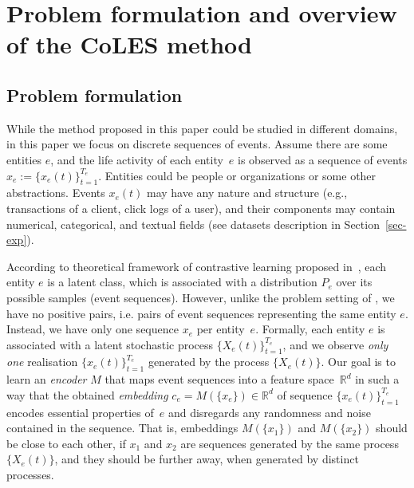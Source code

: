 \documentclass[sigconf]{acmart}
\newcommand{\R}{\mathbb{R}}
\begin{document}

\section{Problem formulation and overview of the CoLES method} \label{sec-method}

\subsection{Problem formulation} \label{sec:problem setting}

While the method proposed in this paper could be studied in different domains, in this paper we focus on discrete sequences of events. Assume there are some entities $e$, and the life activity of each entity~$e$ is observed as a sequence of events $x_e:=\{x_e(t)\}^{T_e}_{t=1}$. Entities could be people or organizations or some other abstractions. Events $x_e(t)$ may have any nature and structure (e.g., transactions of a client, click logs of a user), and their components may contain numerical, categorical, and textual fields (see datasets description in Section~\ref{sec-exp}). 

According to theoretical framework of contrastive learning proposed in~\cite{Saunshi2019ICML}, each entity $e$ is a latent class, which is associated with a distribution $P_e$ over its possible samples (event sequences). However, unlike the problem setting of \cite{Saunshi2019ICML}, we have no positive pairs, i.e. pairs of event sequences representing the same entity $e$. Instead, we have only one sequence $x_e$ per entity~$e$. Formally, each entity $e$ is associated with a latent stochastic process $\{X_e(t)\}_{t=1}^{T_e}$, and we observe {\it only one} realisation $\{x_e(t)\}_{t=1}^{T_e}$ generated by the process $\{X_e(t)\}$. Our goal is to learn an \textit{encoder} $M$ that maps event sequences into a feature space~$\R^d$ in such a way that the obtained \textit{embedding} $c_e=M(\{x_e\})\in \R^d$ of sequence $\{x_e(t)\}^{T_e}_{t=1}$ encodes essential properties of~$e$ and disregards any randomness and noise contained in the sequence. That is, embeddings $M(\{x_1\})$ and $M(\{x_2\})$ should be close to each other, if $x_1$ and $x_2$ are sequences generated by the same process $\{X_e(t)\}$, and they should be further away, when generated by distinct processes. 
\end{document}
